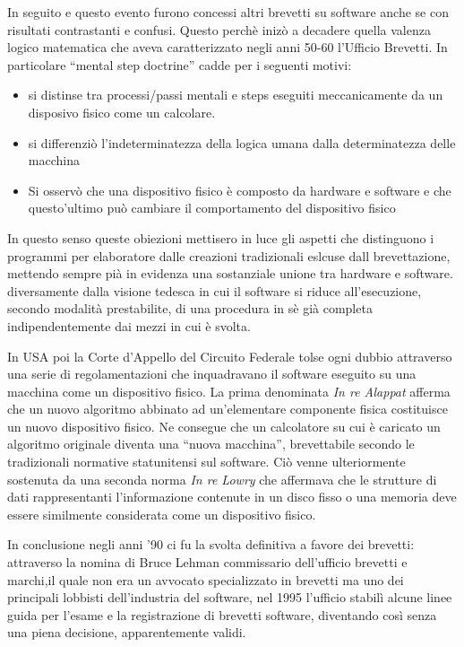 In seguito e questo evento furono concessi altri brevetti su software anche se con risultati contrastanti e confusi. Questo perchè inizò a decadere quella valenza logico matematica che aveva caratterizzato negli anni 50-60 l'Ufficio Brevetti. In particolare ``mental step doctrine'' cadde per i seguenti motivi:

\begin{itemize}
	\item si distinse tra processi/passi mentali e steps eseguiti meccanicamente da un disposivo fisico come un calcolare.
	\item si differenziò l'indeterminatezza della logica umana dalla determinatezza delle macchina
	\item Si osservò che una dispositivo fisico è composto da hardware e software e che questo'ultimo può cambiare il comportamento del dispositivo fisico
\end{itemize}
In questo senso queste obiezioni mettisero in luce gli aspetti che distinguono i programmi per elaboratore dalle creazioni tradizionali eslcuse dall brevettazione, mettendo sempre pià in evidenza una sostanziale unione tra hardware e software. diversamente dalla visione tedesca in cui il software si riduce all'esecuzione, secondo modalità prestabilite, di una procedura in sè già completa indipendentemente dai mezzi in cui è svolta.

In USA poi la Corte d'Appello del Circuito Federale tolse ogni dubbio attraverso una serie di regolamentazioni che inquadravano il software eseguito su una macchina come un dispositivo fisico. La prima denominata \textit{In re Alappat} afferma che un nuovo algoritmo abbinato ad un'elementare componente fisica costituisce un nuovo dispositivo fisico. Ne consegue che un calcolatore su cui è caricato un algoritmo originale diventa una ``nuova macchina'', brevettabile secondo le tradizionali normative statunitensi sul software. Ciò venne ulteriormente sostenuta da una seconda norma \textit{In re Lowry} che affermava che le strutture di dati rappresentanti l'informazione contenute in un disco fisso o una memoria deve essere similmente considerata come un dispositivo fisico.

In conclusione negli anni '90 ci fu la svolta definitiva a favore dei brevetti: attraverso la nomina di Bruce Lehman commissario dell'ufficio brevetti e marchi,il quale non era un avvocato specializzato in brevetti ma uno dei principali lobbisti dell'industria del software, nel 1995 l'ufficio stabilì alcune linee guida per l'esame e la registrazione di brevetti software, diventando così senza una piena decisione, apparentemente validi.

